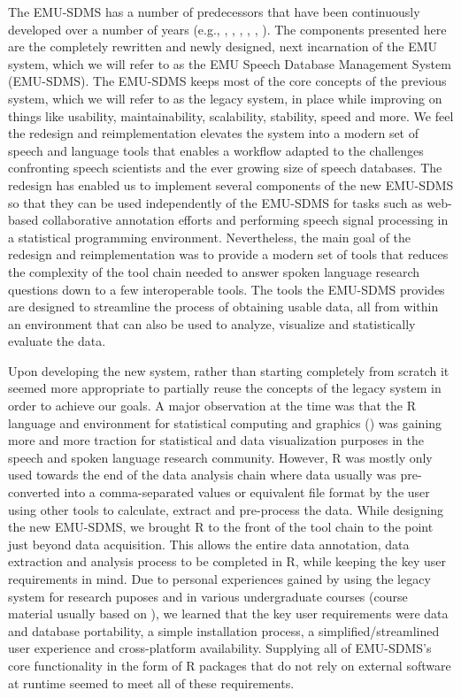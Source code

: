 \documentclass[]{book}
\begin{document}
The EMU-SDMS has a number of predecessors that have been continuously developed over a number of years (e.g., \citet{harrington:csl1993a}, \citet{cassidy:1996a}, \citet{cassidy:sc2001a}, \citet{bombien:2006a}, \citet{harrington:2010a}, \citet{john:2012a}). The components presented here are the completely rewritten and newly designed, next incarnation of the EMU system, which we will refer to as the EMU Speech Database Management System (EMU-SDMS). The EMU-SDMS keeps most of the core concepts of the previous system, which we will refer to as the legacy system, in place while improving on things like usability, maintainability, scalability, stability, speed and more. We feel the redesign and reimplementation elevates the system into a modern set of speech and language tools that enables a workflow adapted to the challenges confronting speech scientists and the ever growing size of speech databases. The redesign has enabled us to implement several components of the new EMU-SDMS so that they can be used independently of the EMU-SDMS for tasks such as web-based collaborative annotation efforts and performing speech signal processing in a statistical programming environment. Nevertheless, the main goal of the redesign and reimplementation was to provide a modern set of tools that reduces the complexity of the tool chain needed to answer spoken language research questions down to a few interoperable tools. The tools the EMU-SDMS provides are designed to streamline the process of obtaining usable data, all from within an environment that can also be used to analyze, visualize and statistically evaluate the data.

Upon developing the new system, rather than starting completely from scratch it seemed more appropriate to partially reuse the concepts of the legacy system in order to achieve our goals. A major observation at the time was that the R language and environment for statistical computing and graphics (\citet{r-core-team:2016a}) was gaining more and more traction for statistical and data visualization purposes in the speech and spoken language research community. However, R was mostly only used towards the end of the data analysis chain where data usually was pre-converted into a comma-separated values or equivalent file format by the user using other tools to calculate, extract and pre-process the data. While designing the new EMU-SDMS, we brought R to the front of the tool chain to the point just beyond data acquisition. This allows the entire data annotation, data extraction and analysis process to be completed in R, while keeping the key user requirements in mind. Due to personal experiences gained by using the legacy system for research puposes and in various undergraduate courses (course material usually based on \citet{harrington:2010a}), we learned that the key user requirements were data and database portability, a simple installation process, a simplified/streamlined user experience and cross-platform availability. Supplying all of EMU-SDMS's core functionality in the form of R packages that do not rely on external software at runtime seemed to meet all of these requirements.
\end{document}

